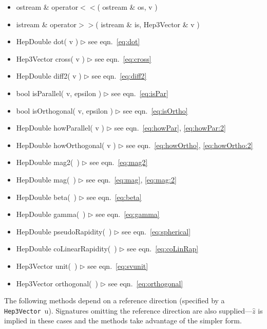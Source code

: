 \documentclass[twoside,12pt]{article}
\def \SV {{\tt Hep3Vector}}
\newcommand {\see}[1] {\hfill$\triangleright$ see eqn.~#1}
\newenvironment{shortlist}{%
\begin{itemize}
\setlength{\itemsep}{0pt}
\setlength{\parskip}{0pt}
}{%
\end{itemize}
}
\begin{document}
\begin{shortlist}
  \item ostream \& operator$<<$( ostream \& os, v )
  \item istream \& operator$>>$( istream \& is, Hep3Vector \& v )
\end{shortlist}
\begin{shortlist}
  \item HepDouble dot( v ) \see{\ref{eq:dot}}
  \item Hep3Vector cross( v ) \see{\ref{eq:cross}}
  \item HepDouble diff2( v ) \see{\ref{eq:diff2}}
  \item bool isParallel( v, epsilon ) \see{\ref{eq:isPar}}
  \item bool isOrthogonal( v, epsilon ) \see{\ref{eq:isOrtho}}
  \item HepDouble howParallel( v ) \see{\ref{eq:howPar}, \ref{eq:howPar:2}}
  \item HepDouble howOrthogonal( v ) \see{\ref{eq:howOrtho}, \ref{eq:howOrtho:2}}
\end{shortlist}

\begin{shortlist}
  \item HepDouble mag2(~) \see{\ref{eq:mag2}}
  \item HepDouble mag(~) \see{\ref{eq:mag}, \ref{eq:mag:2}}
  \item HepDouble beta(~) \see{\ref{eq:beta}}
  \item HepDouble gamma(~) \see{\ref{eq:gamma}}
  \item HepDouble pseudoRapidity(~) \see{\ref{eq:spherical}}
  \item HepDouble coLinearRapidity(~) \see{\ref{eq:coLinRap}}
  \item Hep3Vector unit(~) \see{\ref{eq:svunit}}
  \item Hep3Vector orthogonal(~) \see{\ref{eq:orthogonal}}
\end{shortlist}

\noindent
The following methods depend on a reference direction
(specified by a \SV\ u).  Signatures omitting
the reference direction are also supplied---$\hat{z}$ is implied in these
cases and the methods take advantage of the simpler form.
\end{document}
